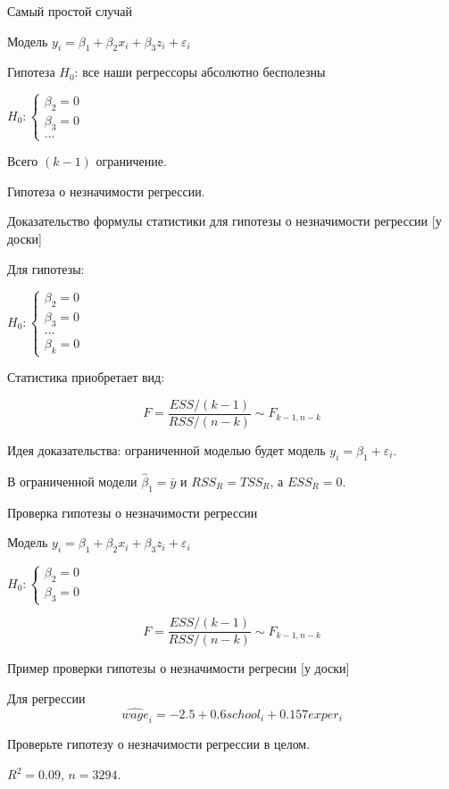 \documentclass[ignorenonframetext,]{beamer}
\newcommand{\e}{\varepsilon}
\newcommand{\hb}{\hat{\beta}}
\begin{document}
\begin{frame}{Самый простой случай}

Модель \(y_i = \beta_1 + \beta_2 x_i + \beta_3 z_i + \varepsilon_i\)

Гипотеза \(H_0\): все наши регрессоры абсолютно бесполезны

\(H_0: \begin{cases} \beta_2 =0 \\ \beta_3 = 0 \\ ... \end{cases}\)

Всего \((k-1)\) ограничение.

Гипотеза о незначимости регрессии.

\end{frame}

\begin{frame}{Доказательство формулы статистики для гипотезы о
незначимости регрессии {[}у доски{]}}

Для гипотезы:

\(H_0: \begin{cases} \beta_2 =0 \\ \beta_3 = 0 \\ ... \\ \beta_k= 0 \end{cases}\)

Статистика приобретает вид:

\[
F=\frac{ESS/(k-1)}{RSS/(n-k)} \sim F_{k-1, n-k}
\]

Идея доказательства: ограниченной моделью будет модель
\(y_i=\beta_1 + \e_i\).

В ограниченной модели \(\hb_1=\bar{y}\) и \(RSS_R=TSS_R\), а
\(ESS_R=0\).

\end{frame}

\begin{frame}{Проверка гипотезы о незначимости регрессии}

Модель \(y_i = \beta_1 + \beta_2 x_i + \beta_3 z_i + \varepsilon_i\)

\(H_0: \begin{cases} \beta_2 =0 \\ \beta_3 = 0 \end{cases}\)

\[
F=\frac{ESS/(k-1)}{RSS/(n-k)} \sim F_{k-1, n-k}
\]

\end{frame}

\begin{frame}{Пример проверки гипотезы о незначимости регресии {[}у
доски{]}}

Для регрессии \[
\widehat{wage}_i=-2.5+0.6 school_i + 0.157 exper_i
\]

Проверьте гипотезу о незначимости регрессии в целом.

\(R^2=0.09\), \(n=3294\).

\end{frame}
\end{document}
